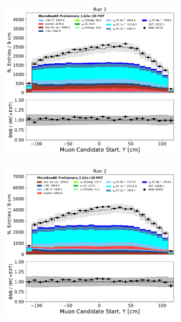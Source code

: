 \begin{figure}[hbt!] 
\begin{center}
    \begin{subfigure}[b]{0.35\textwidth}
        \centering
        \includegraphics[width=1.00\textwidth]{NuMuCCsel/Images/Ryan/Run1/trk_sce_start_y_v_08052020_presel_samples_longest_noCRT_event_category.pdf}
    \end{subfigure}
    \begin{subfigure}[b]{0.35\textwidth}
        \centering
        \includegraphics[width=1.00\textwidth]{NuMuCCsel/Images/Ryan/Run2/trk_sce_start_y_v_08052020_presel_samples_longest_noCRT_event_category.pdf}

\end{subfigure}
\end{center}
\end{figure}
